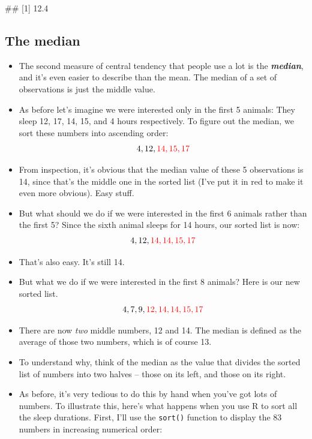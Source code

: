 \documentclass[
]{book}
\newenvironment{Shaded}{\begin{snugshade}}{\end{snugshade}}
\newcommand{\NormalTok}[1]{#1}
\begin{document}
\begin{Shaded}
\begin{Highlighting}[]
\NormalTok{\#\# [1] 12.4}
\end{Highlighting}
\end{Shaded}

\subsection{The median}\label{median}

\begin{itemize}
\item
  The second measure of central tendency that people use a lot is the \textbf{\emph{median}}, and it's even easier to describe than the mean. The median of a set of observations is just the middle value.
\item
  As before let's imagine we were interested only in the first 5 animals: They sleep 12, 17, 14, 15, and 4 hours respectively. To figure out the median, we sort these numbers into ascending order:
  \[
  4, 12, \color{red}{14}, 15, 17
  \]
\item
  From inspection, it's obvious that the median value of these 5 observations is 14, since that's the middle one in the sorted list (I've put it in red to make it even more obvious). Easy stuff.
\item
  But what should we do if we were interested in the first 6 animals rather than the first 5? Since the sixth animal sleeps for 14 hours, our sorted list is now:
  \[
  4, 12, \color{red}{14}, \color{red}{14}, 15, 17
  \]
\item
  That's also easy. It's still 14.
\item
  But what we do if we were interested in the first 8 animals? Here is our new sorted list.
  \[
  4,  7,  9, \color{red}{12}, \color{red}{14}, 14, 15, 17
  \]
\item
  There are now \emph{two} middle numbers, 12 and 14. The median is defined as the average of those two numbers, which is of course 13.
\item
  To understand why, think of the median as the value that divides the sorted list of numbers into two halves -- those on its left, and those on its right.
\item
  As before, it's very tedious to do this by hand when you've got lots of numbers. To illustrate this, here's what happens when you use R to sort all the sleep durations. First, I'll use the \texttt{sort()} function to display the 83 numbers in increasing numerical order:
\end{itemize}
\end{document}
